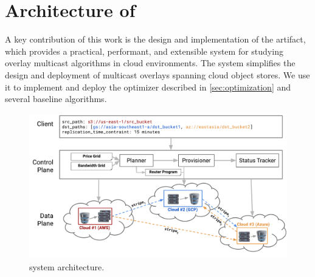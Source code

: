 \section{Architecture of \sys{}}

A key contribution of this work is the design and implementation of the \sys artifact, which provides a practical, performant, and extensible system for studying overlay multicast algorithms in cloud environments.
The \sys{} system simplifies the design and deployment of multicast overlays spanning cloud object stores.
We use it to implement and deploy the optimizer described in \cref{sec:optimization} and several baseline algorithms.







\begin{figure}[t]
    \centering
    \includegraphics[width=\linewidth]{figures/cloudcast-architecture.pdf}
    \caption{\sys{} system architecture.}
    \label{fig:architecture}
\end{figure}






